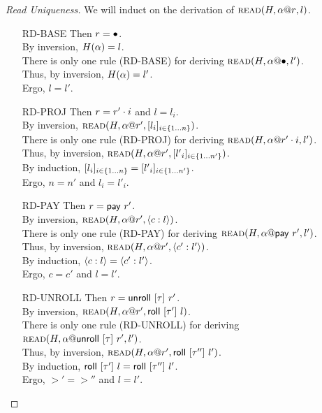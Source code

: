 \begin{proof}[Read Uniqueness]
  We will induct on the derivation of $\textsc{read}({H},{{\alpha}@{r}},{l})$.
  \begin{itemize}
    \item[\textsc{RD-BASE}] Then $r = \bullet$. \\
      By inversion, $H(\alpha)=l$. \\
      There is only one rule (\textsc{RD-BASE}) for deriving $\textsc{read}({H},{{\alpha}@{\bullet}},{l'})$. \\
      Thus, by inversion, $H(\alpha)=l'$. \\
      Ergo, $l = l'$.
    \item[\textsc{RD-PROJ}] Then $r = {r'}\cdot{i}$ and $l = l_i$. \\
      By inversion, $\textsc{read}({H},{{\alpha}@{r'}},{[{{l}_{i}}]_{{i} \in \{1 \ldots {n}\} }})$. \\
      There is only one rule (\textsc{RD-PROJ}) for
      deriving $\textsc{read}({H},{{\alpha}@{{r'}\cdot{i}}},{l'})$. \\
      Thus, by inversion, $\textsc{read}({H},{{\alpha}@{r'}},{[{{l'}_{i}}]_{{i} \in \{1 \ldots {n'}\} }})$. \\
      By induction, $[{{l}_{i}}]_{{i} \in \{1 \ldots {n}\} } = [{{l'}_{i}}]_{{i} \in \{1 \ldots {n'}\} }$. \\
      Ergo, $n = n'$ and $l_i = l'_i$.
    \item[\textsc{RD-PAY}] Then $r = \mathsf{pay}~{r'}$. \\
      By inversion, $\textsc{read}({H},{{\alpha}@{r'}},{\langle{{c}:{l}}\rangle})$. \\
      There is only one rule (\textsc{RD-PAY}) for deriving $\textsc{read}({H},{{\alpha}@{\mathsf{pay}~{r'}}},{l'})$. \\
      Thus, by inversion, $\textsc{read}({H},{{\alpha}@{r'}},{\langle{{c'}:{l'}}\rangle})$. \\
      By induction, $\langle{{c}:{l}}\rangle = \langle{{c'}:{l'}}\rangle$. \\
      Ergo, $c = c'$ and $l = l'$.
    \item[\textsc{RD-UNROLL}] Then $r = \mathsf{unroll}~[{\tau}]~{r'}$. \\
      By inversion, $\textsc{read}({H},{{\alpha}@{r'}},{\mathsf{roll}~[{\tau'}]~{l}})$. \\
      There is only one rule (\textsc{RD-UNROLL}) for
      deriving $\textsc{read}({H},{{\alpha}@{\mathsf{unroll}~[{\tau}]~{r'}}},{l'})$. \\
      Thus, by inversion, $\textsc{read}({H},{{\alpha}@{r'}},{\mathsf{roll}~[{\tau''}]~{l'}})$. \\
      By induction, $\mathsf{roll}~[{\tau'}]~{l} = \mathsf{roll}~[{\tau''}]~{l'}$. \\
      Ergo, $\gt' = \gt''$ and $l = l'$.
  \end{itemize}
\end{proof}

